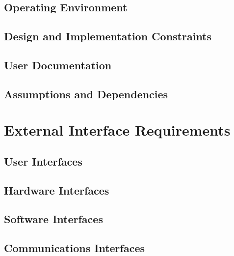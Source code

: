         \section{Operating Environment}
            
        \section{Design and Implementation Constraints}
            
        \section{User Documentation}
            
        \section{Assumptions and Dependencies}
            
    
    \newpage
    \chapter{External Interface Requirements}\label{ch:External Interface Requirements}
        \section{User Interfaces}
            
        \section{Hardware Interfaces}
            
        \section{Software Interfaces}
            
        \section{Communications Interfaces}
            
    
